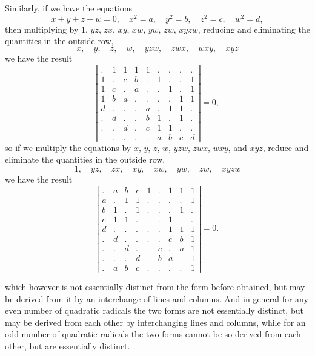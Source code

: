 \documentclass[11pt,a4paper]{book}
\begin{document}
Similarly, if we have the equations
\[
x + y + z + w = 0, \quad x^2 = a, \quad y^2 = b, \quad z^2 = c, \quad w^2 = d,
\]
then multiplying by $1$, $yz$, $zx$, $xy$, $xw$, $yw$, $zw$, $xyzw$, reducing and eliminating the quantities in the outside row,
\[
x, \quad y, \quad z, \quad w, \quad yzw, \quad zwx, \quad wxy, \quad xyz
\]
we have the result
\[
\left|\begin{array}{cccc|c|ccc|c}
. & 1 & 1 & 1 & 1 & . & . & . & . \\
1 & . & c & b & . & 1 & . & . & 1 \\
1 & c & . & a & . & . & 1 & . & 1 \\
1 & b & a & . & . & . & . & 1 & 1 \\
\hline
d & . & . & . & a & . & 1 & 1 & . \\
. & d & . & . & b & 1 & . & 1 & . \\
. & . & d & . & c & 1 & 1 & . & . \\
\hline
. & . & . & . & . & a & b & c & d
\end{array}\right| = 0;
\]
so if we multiply the equations by $x$, $y$, $z$, $w$, $yzw$, $zwx$, $wxy$, and $xyz$, reduce and eliminate the quantities in the outside row,
\[
1, \quad yz, \quad zx, \quad xy, \quad xw, \quad yw, \quad zw, \quad xyzw
\]
we have the result
\[
\left|\begin{array}{cccc|c|ccc|c}
. & a & b & c & 1 & . & 1 & 1 & 1 \\
a & . & 1 & 1 & . & . & . & . & 1 \\
b & 1 & . & 1 & . & . & . & 1 & . \\
c & 1 & 1 & . & . & . & 1 & . & . \\
\hline
d & . & . & . & . & . & 1 & 1 & 1 \\
. & d & . & . & . & . & c & b & 1 \\
. & . & d & . & . & c & . & a & 1 \\
. & . & . & d & . & b & a & . & 1 \\
\hline
. & a & b & c & . & . & . & . & 1
\end{array}\right| = 0.
\]

\newpage
\setcounter{page}{42}

which however is not essentially distinct from the form before obtained, but may be derived from it by an interchange of lines and columns. And in general for any even number of quadratic radicals the two forms are not essentially distinct, but may be derived from each other by interchanging lines and columns, while for an odd number of quadratic radicals the two forms cannot be so derived from each other, but are essentially distinct.
\end{document}
